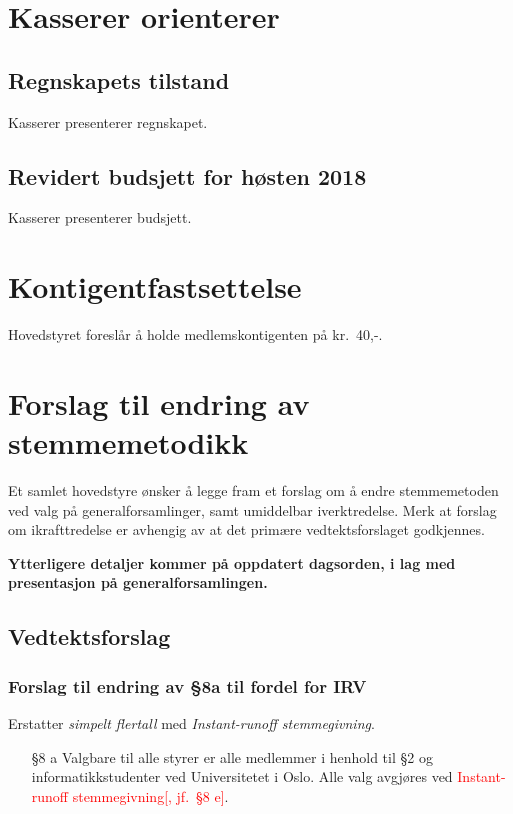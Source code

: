 \documentclass[10pt,norsk,a4paper]{article}
\begin{document}

\section{Kasserer orienterer}
\subsection{Regnskapets tilstand}
Kasserer presenterer regnskapet.


\subsection{Revidert budsjett for høsten 2018}
Kasserer presenterer budsjett.


\section{Kontigentfastsettelse}
Hovedstyret foreslår å holde medlemskontigenten på kr.~40,-.

\section{Forslag til endring av stemmemetodikk}

Et samlet hovedstyre ønsker å legge fram et forslag om å endre stemmemetoden ved valg på generalforsamlinger, samt umiddelbar iverktredelse.
Merk at forslag om ikrafttredelse er avhengig av at det primære vedtektsforslaget godkjennes.

\textbf{Ytterligere detaljer kommer på oppdatert dagsorden, i lag med presentasjon på generalforsamlingen.}

\subsection{Vedtektsforslag}

\subsubsection{Forslag til endring av §8a til fordel for IRV}

Erstatter \textit{simpelt flertall} med \textit{Instant-runoff stemmegivning}.

\begin{enumerate}
	\item[§8 a] Valgbare til alle styrer er alle medlemmer i henhold til §2 og informatikkstudenter ved Universitetet i Oslo. Alle valg avgjøres ved \textcolor{red}{Instant-runoff stemmegivning[, jf.~§8 e]}.
\end{enumerate}
\end{document}
